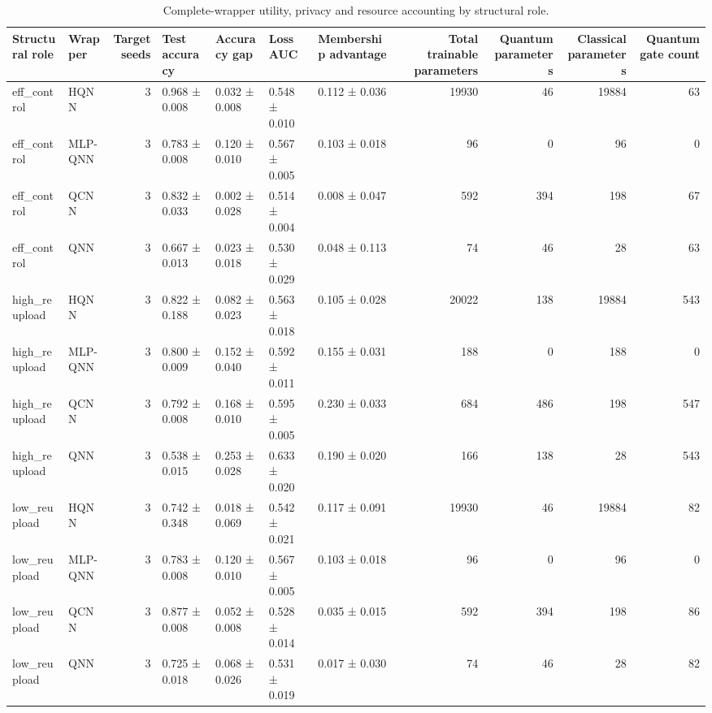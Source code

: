 \begin{table}[t]
\caption{Complete-wrapper utility, privacy and resource accounting by structural role.}
\label{tab:architecture-wrappers}
\begin{tabular}{llrllllrrrr}
\toprule
Structural role & Wrapper & Target seeds & Test accuracy & Accuracy gap & Loss AUC & Membership advantage & Total trainable parameters & Quantum parameters & Classical parameters & Quantum gate count \\
\midrule
eff\_control & HQNN & 3 & 0.968 ± 0.008 & 0.032 ± 0.008 & 0.548 ± 0.010 & 0.112 ± 0.036 & 19930 & 46 & 19884 & 63 \\
eff\_control & MLP-QNN & 3 & 0.783 ± 0.008 & 0.120 ± 0.010 & 0.567 ± 0.005 & 0.103 ± 0.018 & 96 & 0 & 96 & 0 \\
eff\_control & QCNN & 3 & 0.832 ± 0.033 & 0.002 ± 0.028 & 0.514 ± 0.004 & 0.008 ± 0.047 & 592 & 394 & 198 & 67 \\
eff\_control & QNN & 3 & 0.667 ± 0.013 & 0.023 ± 0.018 & 0.530 ± 0.029 & 0.048 ± 0.113 & 74 & 46 & 28 & 63 \\
high\_reupload & HQNN & 3 & 0.822 ± 0.188 & 0.082 ± 0.023 & 0.563 ± 0.018 & 0.105 ± 0.028 & 20022 & 138 & 19884 & 543 \\
high\_reupload & MLP-QNN & 3 & 0.800 ± 0.009 & 0.152 ± 0.040 & 0.592 ± 0.011 & 0.155 ± 0.031 & 188 & 0 & 188 & 0 \\
high\_reupload & QCNN & 3 & 0.792 ± 0.008 & 0.168 ± 0.010 & 0.595 ± 0.005 & 0.230 ± 0.033 & 684 & 486 & 198 & 547 \\
high\_reupload & QNN & 3 & 0.538 ± 0.015 & 0.253 ± 0.028 & 0.633 ± 0.020 & 0.190 ± 0.020 & 166 & 138 & 28 & 543 \\
low\_reupload & HQNN & 3 & 0.742 ± 0.348 & 0.018 ± 0.069 & 0.542 ± 0.021 & 0.117 ± 0.091 & 19930 & 46 & 19884 & 82 \\
low\_reupload & MLP-QNN & 3 & 0.783 ± 0.008 & 0.120 ± 0.010 & 0.567 ± 0.005 & 0.103 ± 0.018 & 96 & 0 & 96 & 0 \\
low\_reupload & QCNN & 3 & 0.877 ± 0.008 & 0.052 ± 0.008 & 0.528 ± 0.014 & 0.035 ± 0.015 & 592 & 394 & 198 & 86 \\
low\_reupload & QNN & 3 & 0.725 ± 0.018 & 0.068 ± 0.026 & 0.531 ± 0.019 & 0.017 ± 0.030 & 74 & 46 & 28 & 82 \\
\bottomrule
\end{tabular}
\end{table}
